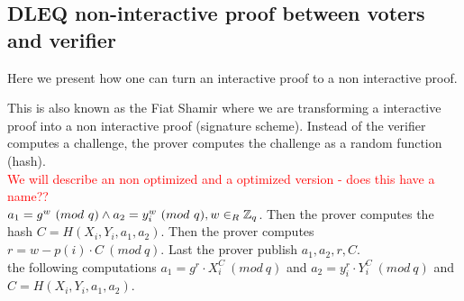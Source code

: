 \subsection{DLEQ non-interactive proof between voters and verifier}
Here we present how one can turn an interactive proof to a non interactive proof.

 This is also known as the Fiat Shamir where we are transforming a interactive proof into a non interactive proof (signature scheme). Instead of the verifier computes a challenge, the prover computes the challenge as a random function (hash).\\
\textcolor{red}{We will describe an non optimized and a optimized version - does this have a name??}\\


 \begin{math}a_1=g^w \ (mod\ q)  \land a_2=y_i^w \ (mod\ q),  w\in_R \Z_q \end{math}. Then the prover computes the hash \begin{math}C=H(X_i,Y_i,a_1,a_2) \end{math}. Then the prover computes  \begin{math}r=w-p(i)  \cdot  C \ (mod\ q)\end{math}. Last the prover publish \begin{math}a_1, a_2,r,C\end{math}. \\

\noindent
{} the following computations \begin{math}a_1 = g^r \cdot X_i^C  \ (mod\ q)\end{math} and \begin{math} a_2=y_i^r  \cdot  Y_i^C \ (mod\ q)\end{math} and \begin{math}C=H(X_i,Y_i,a_1,a_2)\end{math}.


